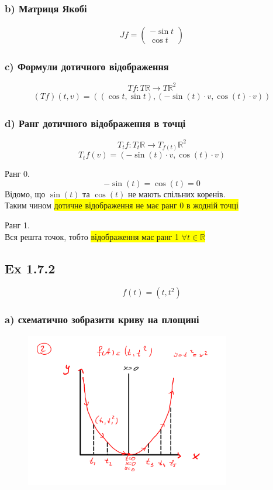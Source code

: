 \documentclass[10pt, a4paper]{article} %
\newcommand{\R}{\mathbb{R}}
\begin{document}
\subsubsection*{b) Матриця Якобі}
\begin{align*}
    Jf = \begin{pmatrix}
        -\sin t \\ \cos t
    \end{pmatrix}
\end{align*}

\subsubsection*{c) Формули дотичного відображення}
\[Tf : T\R \to T\R^2\]
\begin{align*}
    (Tf)(t, v) = \left((\cos t, \sin t), (-\sin(t) \cdot v , \cos(t) \cdot v)\right)
\end{align*}

\subsubsection*{d) Ранг дотичного відображення в точці}
\[T_{t}f: T_{t}\R \to T_{f(t)}\R^2\]
\[T_{t}f(v) = (-\sin(t) \cdot v , \cos(t) \cdot v)\]

Ранг 0.
\[-\sin(t) = \cos(t) = 0\]
Відомо, що $\sin(t)$ та $\cos(t)$ не мають спільних коренів. \\
Таким чином \colorbox{yellow}{дотичне відображення не має ранг 0 в жодній точці}

Ранг 1.\\
Вся решта точок, тобто \colorbox{yellow}{відображення має ранг 1 $\forall t \in \R$}


\subsection*{Ex 1.7.2}
\[f(t) = (t, t^2)\]

\subsubsection*{a) схематично зобразити криву на площині}
\begin{figure}[h]
    \includegraphics[width=0.8\textwidth]{1.7.2.png}
    \centering
\end{figure}
\end{document}
